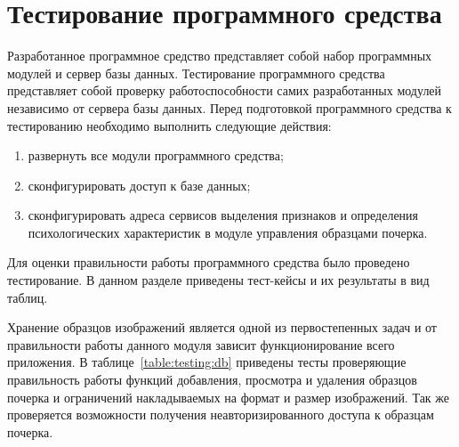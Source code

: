 \newcommand{\tableHead}{\hline Название тест-кейса & Шаги & Ожидаемый результат & Результат \\ \hline}

\section{Тестирование программного средства}
\label{sec:testing}

Разработанное программное средство представляет собой набор программных модулей и сервер базы данных. Тестирование программного средства представляет собой проверку работоспособности самих разработанных модулей независимо от сервера базы данных. 
Перед подготовкой программного средства к тестированию необходимо выполнить следующие действия:
\begin{enumerate}
  \item развернуть все модули программного средства;
  \item сконфигурировать доступ к базе данных;
  \item сконфигурировать адреса сервисов выделения признаков и определения психологических характеристик в модуле управления образцами почерка.
\end{enumerate}

Для оценки правильности работы программного средства было проведено тестирование. В данном разделе приведены тест-кейсы и их результаты в вид таблиц.

Хранение образцов изображений является одной из первостепенных задач и от правильности работы данного модуля зависит функционирование всего приложения. В таблице~\ref{table:testing:db} приведены тесты проверяющие правильность работы функций добавления, просмотра и удаления образцов почерка и ограничений накладываемых на формат и размер изображений. Так же проверяется возможности получения неавторизированного доступа к образцам почерка.


